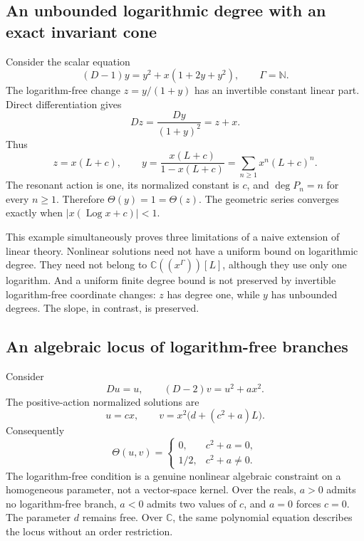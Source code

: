 \documentclass[11pt,a4paper]{article}
\numberwithin{equation}{section}
\theoremstyle{definition}
\theoremstyle{remark}
\newcommand{\CC}{\mathbb C}
\newcommand{\NN}{\mathbb N}
\newcommand{\G}{\Gamma}
\newcommand{\Log}{\operatorname{Log}}
\begin{document}
\subsection{An unbounded logarithmic degree with an exact invariant cone}
Consider the scalar equation
\begin{equation}\label{eq:geometric-ode}
 (D-1)y=y^2+x(1+2y+y^2),\qquad \G=\NN.
\end{equation}
The logarithm-free change \(z=y/(1+y)\) has an invertible constant
linear part. Direct differentiation gives
\[
 Dz=\frac{Dy}{(1+y)^2}=z+x.
\]
Thus
\begin{equation}\label{eq:geometric-solution}
 z=x(L+c),\qquad
 y=\frac{x(L+c)}{1-x(L+c)}
   =\sum_{n\ge1}x^n(L+c)^n.
\end{equation}
The resonant action is one, its normalized constant is \(c\), and
\(\deg P_n=n\) for every \(n\ge1\). Therefore
\(\Theta(y)=1=\Theta(z)\). The geometric series converges exactly
when \(|x(\Log x+c)|<1\).

This example simultaneously proves three limitations of a naive
extension of linear theory. Nonlinear solutions need not have a
uniform bound on logarithmic degree. They need not belong to
\(\CC((x^\G))[L]\), although they use only one logarithm. And a
uniform finite degree bound is not preserved by invertible
logarithm-free coordinate changes: \(z\) has degree one, while \(y\)
has unbounded degrees. The slope, in contrast, is preserved.

\subsection{An algebraic locus of logarithm-free branches}
Consider
\begin{equation}\label{eq:cancellation-example}
 Du=u,\qquad (D-2)v=u^2+a x^2.
\end{equation}
The positive-action normalized solutions are
\begin{equation}\label{eq:cancellation-solution}
 u=cx,\qquad v=x^2\bigl(d+(c^2+a)L\bigr).
\end{equation}
Consequently
\[
 \Theta(u,v)=
 \begin{cases}
 0,&c^2+a=0,\\
 1/2,&c^2+a\ne0.
 \end{cases}
\]
The logarithm-free condition is a genuine nonlinear algebraic
constraint on a homogeneous parameter, not a vector-space kernel.
Over the reals, \(a>0\) admits no logarithm-free branch, \(a<0\)
admits two values of \(c\), and \(a=0\) forces \(c=0\).
The parameter \(d\) remains free. Over \(\CC\), the same polynomial
equation describes the locus without an order restriction.
\end{document}
